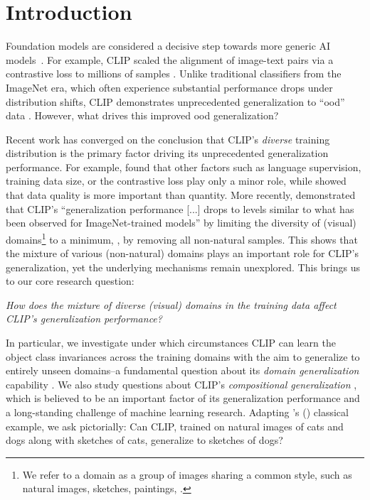 \section{Introduction}
Foundation models are considered a decisive step towards more generic AI models~\citep{bommasani2021opportunities}. For example, CLIP scaled the alignment of image-text pairs via a contrastive loss to millions of samples \citep{radford2021learning,jia2021scaling,zhai2023sigmoid}.
Unlike traditional classifiers from the ImageNet era, which often experience substantial performance drops under distribution shifts, CLIP demonstrates unprecedented generalization to ``\acrfull{ood}'' data \citep{radford2021learning}. However, what drives this improved \acrshort{ood} generalization?

Recent work has converged on the conclusion that CLIP's \emph{diverse} training distribution is the primary factor driving its unprecedented generalization performance. For example, \citet{fang2022data} found that other factors such as language supervision, training data size, or the contrastive loss play only a minor role, while \citet{nguyen2022quality} showed that data quality is more important than quantity. More recently, \citet{mayilvahanan2024search} demonstrated that CLIP's ``generalization performance [...] drops to levels similar to what has been observed for ImageNet-trained models'' \citep[p.~10]{mayilvahanan2024search} by limiting the diversity of (visual) domains\footnote{We refer to a domain as a group of images sharing a common style, such as natural images, sketches, paintings, \etc.} to a minimum, \ie, by removing all non-natural samples. This shows that the mixture of various (non-natural) domains plays an important role for CLIP's generalization, yet the underlying mechanisms remain unexplored. This brings us to our core research question:
\begin{center}
    \emph{How does the mixture of diverse (visual) domains in the training data affect CLIP's generalization performance?}
\end{center}
In particular, we investigate under which circumstances CLIP can learn the object class invariances across the training domains with the aim to generalize to entirely unseen domains--a fundamental question about its \emph{domain generalization} capability \citep{blanchard2011generalizing,muandet2013domain,gulrajani2021in}. 
We also study questions about CLIP's \emph{compositional generalization} \citep{hupkes2020compositionality,wiedemer2023compositional}, which is believed to be an important factor of its generalization performance \citep{mayilvahanan2024does,udandarao2024no} and a long-standing challenge of machine learning research. Adapting \citeauthor{szabo2012case}'s (\citeyear{szabo2012case}) classical example, we ask pictorially: Can CLIP, trained on natural images of cats and dogs along with sketches of cats, generalize to sketches of dogs?

